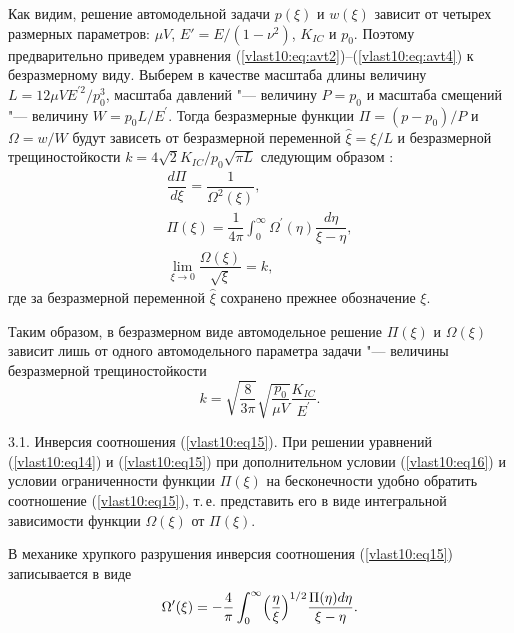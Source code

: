 Как видим, решение автомодельной задачи $p (\xi)$ и $w (\xi)$ зависит от четырех
размерных параметров: $\mu V$, $E'={E}/{(1-\nu^{2})}$, $K_{IC}$ и $p_{0}$.
Поэтому предварительно приведем уравнения  (\ref{vlast10:eq:avt2})--(\ref{vlast10:eq:avt4}) к безразмерному виду.
Выберем в качестве масштаба длины величину $L=12 \mu V E^{\prime2}/p_{0}^{3}$, масштаба давлений "--- величину $P=p_{0}$ и
масштаба смещений "--- величину $W=p_{0}L/E^{\prime}$. Тогда безразмерные функции $\Pi= (p-p_{0})/P$
и $\Omega=w/W$ будут зависеть от безразмерной переменной $\hat{\xi}=\xi/L$ и безразмерной
трещиностойкости $k=4 \sqrt{2}K_{IC}/p_{0}\sqrt{\pi L}$ следующим образом \cite{vlast10:8}:
\begin{gather}
\dfrac{d\Pi}{d\xi}=\dfrac{1}{\Omega^{2}(\xi)},\label{vlast10:eq14}\\
\Pi (\xi)=\dfrac{1}{4\pi} \int _{0}^{\infty}  \Omega^{\prime}(\eta)\dfrac{d\eta}{\xi-\eta},\label{vlast10:eq15}\\
\lim_{\xi \rightarrow 0}\dfrac{\Omega (\xi )}{\sqrt{\xi}}=k,\label{vlast10:eq16}
\end{gather}
где за безразмерной переменной $\hat{\xi}$ сохранено прежнее обозначение $\xi$.

Таким образом, в безразмерном виде автомодельное решение $\Pi (\xi)$ и $\Omega (\xi)$ зависит
лишь от одного автомодельного параметра задачи "--- величины безразмерной трещиностойкости
\begin{equation}
k=\sqrt{\frac{8}{3\pi}}\sqrt{\frac{p_{0}}{\mu V}}\frac{K_{IC}}{E^{\prime}}.\label{vlast10:eq17}
\end{equation}


{\sc \small 3.1. Инверсия соотношения (\ref{vlast10:eq15})}.
При решении уравнений (\ref{vlast10:eq14}) и (\ref{vlast10:eq15}) при дополнительном условии (\ref{vlast10:eq16}) и условии ограниченности
функции $\Pi(\xi)$ на бесконечности удобно обратить соотношение (\ref{vlast10:eq15}), т.\,е. представить его в виде
интегральной зависимости функции $\Omega (\xi)$ от $\Pi (\xi )$.

В механике хрупкого разрушения инверсия соотношения (\ref{vlast10:eq15}) записывается в виде \cite{vlast10:4,vlast10:11}
\begin{equation}
\Omega^{\prime}(\xi)=-\dfrac{4}{\pi}\int_{0}^{\infty}\Bigl(\dfrac{\eta}{\xi}\Bigr)^{1/2}\frac{\Pi(\eta)d\eta}{\xi-\eta}.\label{vlast10:eq:solve_avt1}
\end{equation}


